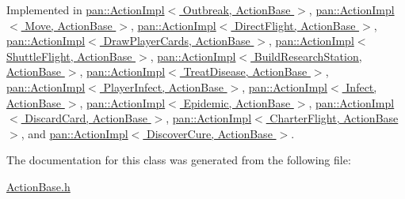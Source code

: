 Implemented in \hyperlink{classpan_1_1_action_impl_acea764a5b41d2fd21717089e21d0c6f4}{pan\+::\+Action\+Impl$<$ Outbreak, Action\+Base $>$}, \hyperlink{classpan_1_1_action_impl_acea764a5b41d2fd21717089e21d0c6f4}{pan\+::\+Action\+Impl$<$ Move, Action\+Base $>$}, \hyperlink{classpan_1_1_action_impl_acea764a5b41d2fd21717089e21d0c6f4}{pan\+::\+Action\+Impl$<$ Direct\+Flight, Action\+Base $>$}, \hyperlink{classpan_1_1_action_impl_acea764a5b41d2fd21717089e21d0c6f4}{pan\+::\+Action\+Impl$<$ Draw\+Player\+Cards, Action\+Base $>$}, \hyperlink{classpan_1_1_action_impl_acea764a5b41d2fd21717089e21d0c6f4}{pan\+::\+Action\+Impl$<$ Shuttle\+Flight, Action\+Base $>$}, \hyperlink{classpan_1_1_action_impl_acea764a5b41d2fd21717089e21d0c6f4}{pan\+::\+Action\+Impl$<$ Build\+Research\+Station, Action\+Base $>$}, \hyperlink{classpan_1_1_action_impl_acea764a5b41d2fd21717089e21d0c6f4}{pan\+::\+Action\+Impl$<$ Treat\+Disease, Action\+Base $>$}, \hyperlink{classpan_1_1_action_impl_acea764a5b41d2fd21717089e21d0c6f4}{pan\+::\+Action\+Impl$<$ Player\+Infect, Action\+Base $>$}, \hyperlink{classpan_1_1_action_impl_acea764a5b41d2fd21717089e21d0c6f4}{pan\+::\+Action\+Impl$<$ Infect, Action\+Base $>$}, \hyperlink{classpan_1_1_action_impl_acea764a5b41d2fd21717089e21d0c6f4}{pan\+::\+Action\+Impl$<$ Epidemic, Action\+Base $>$}, \hyperlink{classpan_1_1_action_impl_acea764a5b41d2fd21717089e21d0c6f4}{pan\+::\+Action\+Impl$<$ Discard\+Card, Action\+Base $>$}, \hyperlink{classpan_1_1_action_impl_acea764a5b41d2fd21717089e21d0c6f4}{pan\+::\+Action\+Impl$<$ Charter\+Flight, Action\+Base $>$}, and \hyperlink{classpan_1_1_action_impl_acea764a5b41d2fd21717089e21d0c6f4}{pan\+::\+Action\+Impl$<$ Discover\+Cure, Action\+Base $>$}.



The documentation for this class was generated from the following file\+:\begin{DoxyCompactItemize}
\item 
\hyperlink{_action_base_8h}{Action\+Base.\+h}\end{DoxyCompactItemize}
